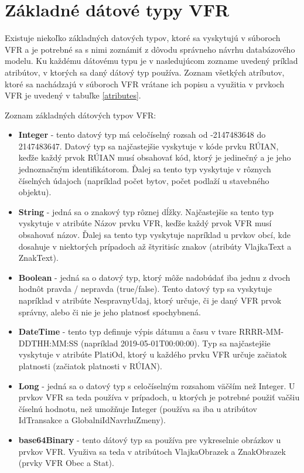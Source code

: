 \section {Základné dátové typy VFR}
Existuje niekoľko základných datových typov, ktoré sa vyskytujú v súboroch VFR a je potrebné sa s nimi zoznámiť z dôvodu správneho návrhu databázového modelu. Ku každému dátovému typu je v nasledujúcom zozname uvedený príklad atribútov, v ktorých sa daný dátový typ používa. Zoznam všetkých atríbutov, ktoré sa nachádzajú v súboroch VFR vrátane ich popisu a využitia v prvkoch VFR je uvedený v tabuľke \ref{atributes}.

Zoznam základných dátových typov VFR: 
\begin{itemize}
    \item {{\bf Integer} -  tento datový typ má celočíselný rozsah od -2147483648 do 2147483647. Datový typ sa najčastejšie vyskytuje v kóde prvku RÚIAN, keďže každý prvok RÚIAN musí obsahovať kód, ktorý je jedinečný a je jeho jednoznačným identifikátorom. Ďalej sa tento typ vyskytuje v rôznych číselných údajoch (napríklad počet bytov, počet podlaží u stavebného objektu).}
    \item{{\bf String} - jedná sa o znakový typ rôznej dĺžky. Najčastejšie sa tento typ vyskytuje v atribúte Názov prvku VFR, keďže každý prvok VFR musí obsahovať názov. Ďalej sa tento typ vyskytuje napríklad u prvkov obcí, kde dosahuje v niektorých prípadoch až štyritisíc znakov (atribúty VlajkaText a ZnakText).}
    \item{{\bf Boolean} - jedná sa o datový typ, ktorý môže nadobúdať iba jednu z dvoch hodnôt pravda / nepravda (true/false). Tento datový typ sa vyskytuje napríklad v atribúte NespravnyUdaj, ktorý určuje, či je daný VFR prvok správny, alebo či nie je jeho platnosť spochybnená.}
    \item{{\bf DateTime} - tento typ definuje výpis dátumu a času v tvare RRRR-MM-DDTHH:MM:SS (napríklad  2019-05-01T00:00:00). Typ sa najčastejšie vyskytuje v atribúte PlatiOd, ktorý u každého prvku VFR určuje začiatok platnosti (začiatok platnosti v RÚIAN).}
    \item{{\bf Long} - jedná sa o datový typ s celočíselným rozsahom väčším než Integer. U prvkov VFR sa teda používa v prípadoch, u ktorých je potrebné použiť vačšiu číselnú hodnotu, než umožňuje Integer (používa sa iba u atribútov IdTransakce a GlobalniIdNavrhuZmeny).}
    \item{{\bf base64Binary} - tento dátový typ sa používa pre vykreselnie obrázkov u prvkov VFR. Využiva sa teda v atribútoch VlajkaObrazek a ZnakObrazek (prvky VFR Obec a Stat)}.
\end{itemize}

